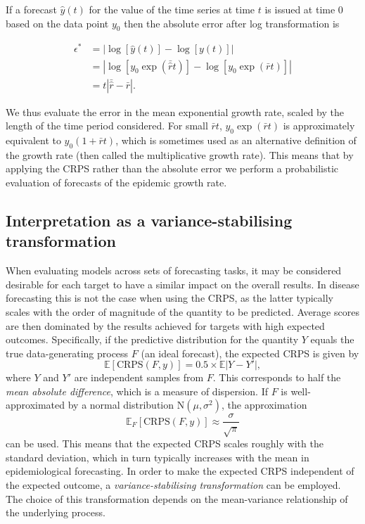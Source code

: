 \documentclass{article}
\begin{document}
If a forecast $\hat{y}(t)$ for the value of the time series at time $t$ is issued at time 0 based on the data point $y_0$ then the absolute error after log transformation is
%
\begin{linenomath*}
\begin{align*}
\epsilon^* &= \left| \log \left[ \hat{y}( t ) \right] - \log \left[ y ( t ) \right] \right|\\
           &= \left| \log \left[ y_0 \exp (\bar{\hat{r}} t ) \right] - \log \left[ y_0 \exp (\bar{r}t) \right] \right|\\
           &= t \left| \bar{\hat{r}} - \bar{r} \right|.
\end{align*}
\end{linenomath*}
%
We thus evaluate the error in the mean exponential growth rate, scaled by the length of the time period considered. For small $\bar{r}t$, $ y_0 \exp (\bar{r}t)$ is approximately equivalent to $ y_0 (1 + \bar{r}t)$, which is sometimes used as an alternative definition of the growth rate (then called the multiplicative growth rate). This means that by applying the CRPS rather than the absolute error we perform a probabilistic evaluation of forecasts of the epidemic growth rate.

\subsection{Interpretation as a variance-stabilising transformation}
\label{sec:methods:vst}

When evaluating models across sets of forecasting tasks, it may be considered desirable for each target to have a similar impact on the overall results. In disease forecasting this is not the case when using the CRPS, as the latter typically scales with the order of magnitude of the quantity to be predicted. Average scores are then dominated by the results achieved for targets with high expected outcomes. 
Specifically, if the predictive distribution for the quantity $Y$ equals the true data-generating process $F$ (an ideal forecast), the expected CRPS is given by \citep{gneitingStrictlyProperScoring2007}
$$
\mathbb{E}[\text{CRPS}(F, y)] = 0.5\times\mathbb{E}|Y - Y'|,
$$
where $Y$ and $Y'$ are independent samples from $F$. This corresponds to half the \textit{mean absolute difference}, which is a measure of dispersion. If $F$ is well-approximated by a normal distribution $\text{N}(\mu, \sigma^2)$, the approximation
$$
\mathbb{E}_F[\text{CRPS}(F, y)] \approx \frac{\sigma}{\sqrt{\pi}}
$$
can be used. This means that the expected CRPS scales roughly with the standard deviation, which in turn typically increases with the mean in epidemiological forecasting. In order to make the expected CRPS independent of the expected outcome, a \textit{variance-stabilising transformation} \citep[VST,][]{bartlettSquareRootTransformation1936} can be employed. The choice of this transformation depends on the mean-variance relationship of the underlying process. 
\end{document}
